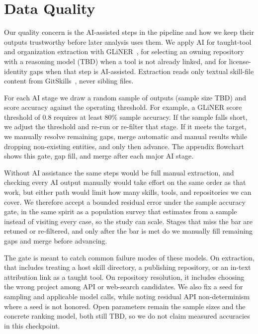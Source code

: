 \section{Data Quality}

Our quality concern is the AI-assisted steps in the pipeline and how we keep
their outputs trustworthy before later analysis uses them.
We apply AI for taught-tool and organization extraction with
GLiNER~\cite{zaratiana2023glinergeneralistmodelnamed}, for selecting an owning
repository with a reasoning model (TBD) when a tool is not already linked, and
for license-identity gaps when that step is AI-assisted.
Extraction reads only textual skill-file content from
GitSkills~\cite{gitskills2027}, never sibling files.

For each AI stage we draw a random sample of outputs (sample size TBD) and
score accuracy against the operating threshold.
For example, a GLiNER score threshold of $0.8$ requires at least $80\%$ sample
accuracy.
If the sample falls short, we adjust the threshold and re-run or re-filter that
stage.
If it meets the target, we manually resolve remaining gaps, merge automatic and
manual results while dropping non-existing entities, and only then advance.
The appendix flowchart shows this gate, gap fill, and merge after each major
AI stage.

Without AI assistance the same steps would be full manual extraction, and
checking every AI output manually would take effort on the same order as that
work, but either path would limit how many skills, tools, and repositories we
can cover.
We therefore accept a bounded residual error under the sample accuracy gate,
in the same spirit as a population survey that estimates from a sample instead
of visiting every case, so the study can scale.
Stages that miss the bar are retuned or re-filtered, and only after the bar
is met do we manually fill remaining gaps and merge before advancing.

The gate is meant to catch common failure modes of these models.
On extraction, that includes treating a host skill directory, a publishing
repository, or an in-text attribution link as a taught tool.
On repository resolution, it includes choosing the wrong project among API or
web-search candidates.
We also fix a seed for sampling and applicable model calls, while noting
residual API non-determinism where a seed is not honored.
Open parameters remain the sample sizes and the concrete ranking model, both
still TBD, so we do not claim measured accuracies in this checkpoint.

